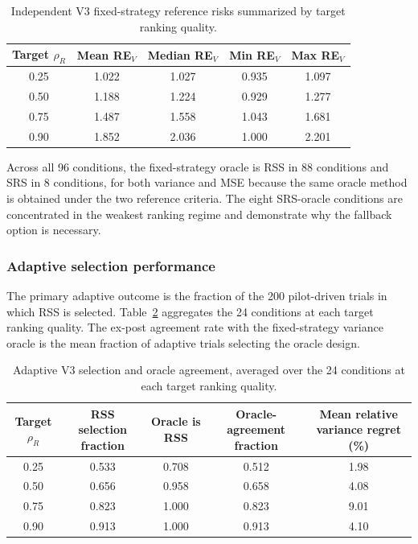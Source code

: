 \documentclass[12pt]{article}
\begin{document}
\begin{table}[htbp]
\centering
\caption{Independent V3 fixed-strategy reference risks summarized by target ranking quality.}
\label{tab:v3_reference_summary}
\begin{tabular}{ccccc}
\toprule
Target $\rho_R$ & Mean RE$_V$ & Median RE$_V$ & Min RE$_V$ & Max RE$_V$ \\
\midrule
0.25 & 1.022 & 1.027 & 0.935 & 1.097 \\
0.50 & 1.188 & 1.224 & 0.929 & 1.277 \\
0.75 & 1.487 & 1.558 & 1.043 & 1.681 \\
0.90 & 1.852 & 2.036 & 1.000 & 2.201 \\
\bottomrule
\end{tabular}
\end{table}

Across all 96 conditions, the fixed-strategy oracle is RSS in 88 conditions and SRS in 8 conditions, for both variance and MSE because the same oracle method is obtained under the two reference criteria. The eight SRS-oracle conditions are concentrated in the weakest ranking regime and demonstrate why the fallback option is necessary.

\subsubsection{Adaptive selection performance}
The primary adaptive outcome is the fraction of the 200 pilot-driven trials in which RSS is selected. Table~\ref{tab:v3_adaptive_by_rho} aggregates the 24 conditions at each target ranking quality. The ex-post agreement rate with the fixed-strategy variance oracle is the mean fraction of adaptive trials selecting the oracle design.

\begin{table}[htbp]
\centering
\caption{Adaptive V3 selection and oracle agreement, averaged over the 24 conditions at each target ranking quality.}
\label{tab:v3_adaptive_by_rho}
\begin{tabular}{ccccc}
\toprule
Target $\rho_R$ & RSS selection fraction & Oracle is RSS & Oracle-agreement fraction & Mean relative variance regret (\%) \\
\midrule
0.25 & 0.533 & 0.708 & 0.512 & 1.98 \\
0.50 & 0.656 & 0.958 & 0.658 & 4.08 \\
0.75 & 0.823 & 1.000 & 0.823 & 9.01 \\
0.90 & 0.913 & 1.000 & 0.913 & 4.10 \\
\bottomrule
\end{tabular}
\end{table}
\end{document}

